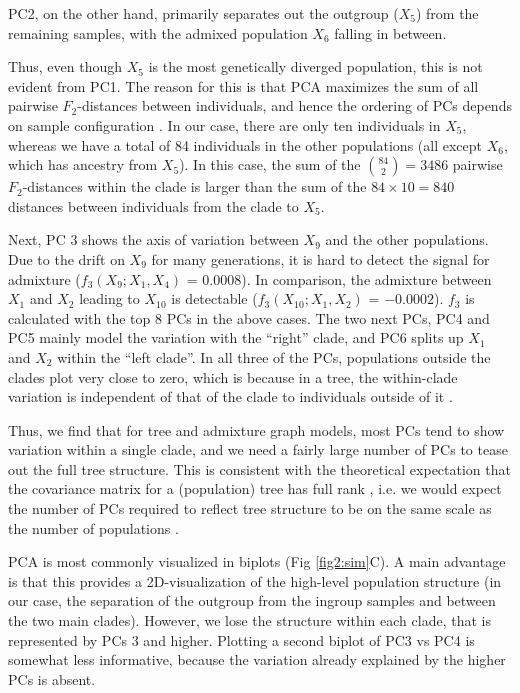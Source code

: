 \documentclass[12pt]{article}
\begin{document}
PC2, on the other hand, primarily separates out the outgroup ($X_5$) from the remaining samples, with the admixed population $X_6$ falling in between.

Thus, even though $X_5$ is the most genetically diverged population, this is not evident from PC1. The reason for this is that PCA maximizes the sum of all pairwise $F_2$-distances between individuals, and hence the ordering of PCs depends on sample configuration \citep{mcvean_genealogical_2009, elhaik_principal_2022}. In our case, there are only ten individuals in $X_5$, whereas we have a total of 84 individuals in the other populations (all except $X_6$, which has ancestry from $X_5$). In this case, the sum of the $\binom{84}{2}=3486$ pairwise $F_2$-distances within the clade is larger than the sum of the $84 \times 10 = 840$ distances between individuals from the clade to $X_5$. 

Next, PC 3 shows the axis of variation between $X_9$ and the other populations. Due to the drift on $X_9$ for many generations, it is hard to detect the signal for admixture ($f_3(X_9; X_1, X_4)$ = $0.0008$). In comparison, the admixture between $X_1$ and $X_2$ leading to $X_{10}$ is detectable ($f_3(X_{10}; X_1, X_2)$ = $-0.0002$). $f_3$ is calculated with the top 8 PCs in the above cases. The two next PCs, PC4 and PC5 mainly model the variation with the ``right'' clade, and PC6 splits up $X_1$ and $X_2$ within the ``left clade''. In all three of the PCs, populations outside the clades plot very close to zero, which is because in a tree, the within-clade variation is independent of that of the clade to individuals outside of it \citep{felsenstein_maximum-likelihood_1973}. 

Thus, we find that for tree and admixture graph models, most PCs tend to show variation within a single clade, and we need a fairly large number of PCs to tease out the full tree structure. This is consistent with the theoretical expectation that the covariance matrix for a (population) tree has full rank \citep{felsenstein_maximum-likelihood_1973}, i.e. we would expect the number of PCs required to reflect tree structure to be on the same scale as the number of populations \citep{patterson_population_2006}. 

PCA is most commonly visualized in biplots (Fig \ref{fig2:sim}C). A main advantage is that this provides a 2D-visualization of the high-level population structure (in our case, the separation of the outgroup from the ingroup samples and between the two main clades). However, we lose the structure within each clade, that is represented by PCs 3 and higher. Plotting a second biplot of PC3 vs PC4 is somewhat less informative, because the variation already explained by the higher PCs is absent.
\end{document}
